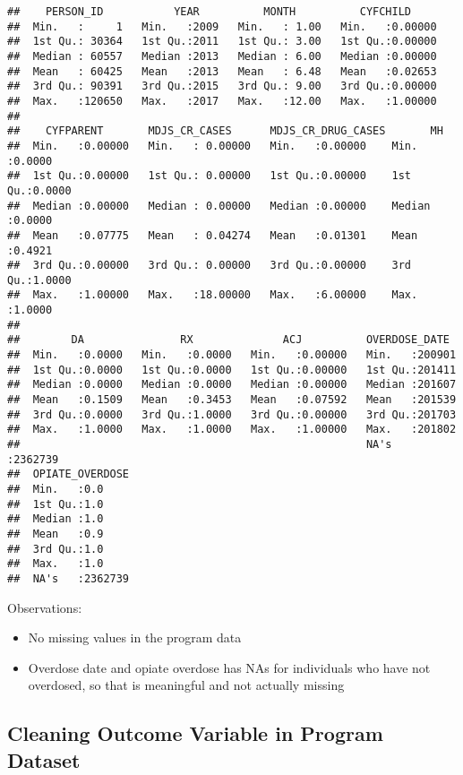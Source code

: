 \documentclass[]{article}
\providecommand{\tightlist}{%
  \setlength{\itemsep}{0pt}\setlength{\parskip}{0pt}}
\begin{document}
\begin{verbatim}
##    PERSON_ID           YEAR          MONTH          CYFCHILD      
##  Min.   :     1   Min.   :2009   Min.   : 1.00   Min.   :0.00000  
##  1st Qu.: 30364   1st Qu.:2011   1st Qu.: 3.00   1st Qu.:0.00000  
##  Median : 60557   Median :2013   Median : 6.00   Median :0.00000  
##  Mean   : 60425   Mean   :2013   Mean   : 6.48   Mean   :0.02653  
##  3rd Qu.: 90391   3rd Qu.:2015   3rd Qu.: 9.00   3rd Qu.:0.00000  
##  Max.   :120650   Max.   :2017   Max.   :12.00   Max.   :1.00000  
##                                                                   
##    CYFPARENT       MDJS_CR_CASES      MDJS_CR_DRUG_CASES       MH        
##  Min.   :0.00000   Min.   : 0.00000   Min.   :0.00000    Min.   :0.0000  
##  1st Qu.:0.00000   1st Qu.: 0.00000   1st Qu.:0.00000    1st Qu.:0.0000  
##  Median :0.00000   Median : 0.00000   Median :0.00000    Median :0.0000  
##  Mean   :0.07775   Mean   : 0.04274   Mean   :0.01301    Mean   :0.4921  
##  3rd Qu.:0.00000   3rd Qu.: 0.00000   3rd Qu.:0.00000    3rd Qu.:1.0000  
##  Max.   :1.00000   Max.   :18.00000   Max.   :6.00000    Max.   :1.0000  
##                                                                          
##        DA               RX              ACJ          OVERDOSE_DATE    
##  Min.   :0.0000   Min.   :0.0000   Min.   :0.00000   Min.   :200901   
##  1st Qu.:0.0000   1st Qu.:0.0000   1st Qu.:0.00000   1st Qu.:201411   
##  Median :0.0000   Median :0.0000   Median :0.00000   Median :201607   
##  Mean   :0.1509   Mean   :0.3453   Mean   :0.07592   Mean   :201539   
##  3rd Qu.:0.0000   3rd Qu.:1.0000   3rd Qu.:0.00000   3rd Qu.:201703   
##  Max.   :1.0000   Max.   :1.0000   Max.   :1.00000   Max.   :201802   
##                                                      NA's   :2362739  
##  OPIATE_OVERDOSE  
##  Min.   :0.0      
##  1st Qu.:1.0      
##  Median :1.0      
##  Mean   :0.9      
##  3rd Qu.:1.0      
##  Max.   :1.0      
##  NA's   :2362739
\end{verbatim}

Observations:

\begin{itemize}
\tightlist
\item
  No missing values in the program data
\item
  Overdose date and opiate overdose has NAs for individuals who have not
  overdosed, so that is meaningful and not actually missing
\end{itemize}

\subsection{Cleaning Outcome Variable in Program
Dataset}\label{cleaning-outcome-variable-in-program-dataset}
\end{document}
